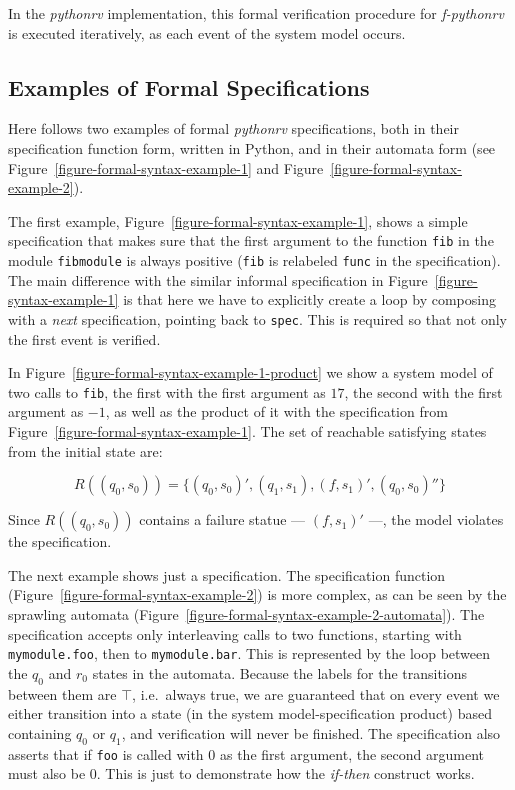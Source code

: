 In the \textit{pythonrv} implementation, this formal verification procedure for
\textit{f-pythonrv} is executed iteratively, as each event of the system model
occurs.





\subsection{Examples of Formal Specifications}
\label{section-approach-examples-of-formal-specifications}
\lstset{language=Python,numbers=none}


Here follows two examples of formal \textit{pythonrv} specifications, both in
their specification function form, written in Python, and in their automata
form (see Figure~\ref{figure-formal-syntax-example-1} and
Figure~\ref{figure-formal-syntax-example-2}).

The first example, Figure~\ref{figure-formal-syntax-example-1}, shows a simple
specification that makes sure that the first argument to the function
\texttt{fib} in the module \texttt{fibmodule} is always positive (\texttt{fib}
is relabeled \texttt{func} in the specification). The main difference with the
similar informal specification in Figure~\ref{figure-syntax-example-1} is that
here we have to explicitly create a loop by composing with a \textit{next}
specification, pointing back to \texttt{spec}. This is required so that not
only the first event is verified.

In Figure~\ref{figure-formal-syntax-example-1-product} we show a system model
of two calls to \texttt{fib}, the first with the first argument as $17$, the
second with the first argument as $-1$, as well as the product of it with
the specification from Figure~\ref{figure-formal-syntax-example-1}. The set of
reachable satisfying states from the initial state are:

\medskip
\[
  R((q_0,s_0)) = \{(q_0,s_0)', (q_1,s_1), (f,s_1)', (q_0,s_0)''\}
\]
\medskip

Since $R((q_0,s_0))$ contains a failure statue --- $(f,s_1)'$ ---, the model
violates the specification.

The next example shows just a specification. The specification function
(Figure~\ref{figure-formal-syntax-example-2}) is more complex, as can be seen
by the sprawling automata
(Figure~\ref{figure-formal-syntax-example-2-automata}). The specification
accepts only interleaving calls to two functions, starting with
\texttt{mymodule.foo}, then to \texttt{mymodule.bar}. This is represented by
the loop between the $q_0$ and $r_0$ states in the automata. Because the labels
for the transitions between them are $\top$, i.e.\ always true, we are
guaranteed that on every event we either transition into a state (in the system
model-specification product) based containing $q_0$ or $q_1$, and verification
will never be finished. The specification also asserts that if \texttt{foo} is
called with $0$ as the first argument, the second argument must also be $0$.
This is just to demonstrate how the \textit{if-then} construct works.


